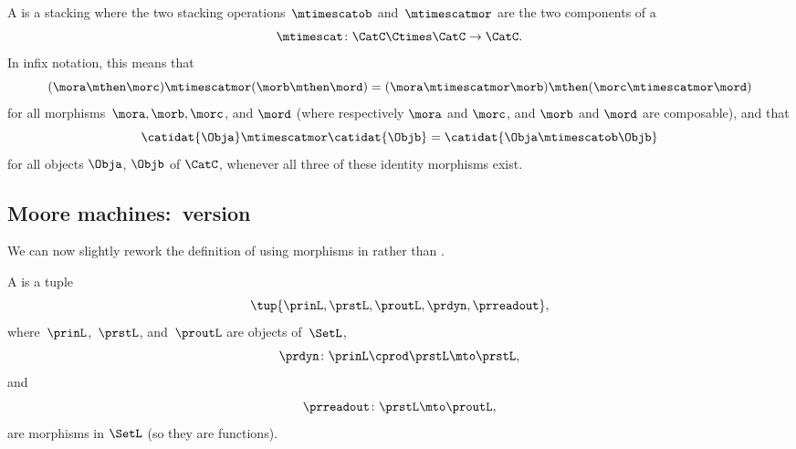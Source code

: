 \begin{ctdefinition}
    \label{def:functorial-stacking-semi-cat}
    A  is a stacking  where the two stacking operations~$\mtimescatob$ and~$\mtimescatmor$ are the two components of a  \begin{equation}
        \mtimescat\colon \CatC \Ctimes \CatC \to \CatC.
    \end{equation}
    In infix notation, this means that
    \begin{equation}
        (\mora \mthen \morc )
        \mtimescatmor (\morb \mthen \mord )
        =
        (\mora \mtimescatmor \morb )
        \mthen (\morc \mtimescatmor \mord )
    \end{equation}
    for all morphisms~$\mora, \morb, \morc$, and $\mord$ (where respectively $\mora$ and $\morc$, and $\morb$ and $\mord$ are composable), and that
    \begin{equation}
        \catidat{\Obja} \mtimescatmor \catidat{\Objb} = \catidat{\Obja \mtimescatob \Objb}
    \end{equation}
    for all objects $\Obja$, $\Objb$ of $\CatC$, whenever all three of these identity morphisms exist.
\end{ctdefinition}


\subsection{Moore machines:~\SetL version}
We can now slightly rework the definition of  using morphisms in \SetL rather than \Set.
\begin{definition}
    \label{def:moore-machine}
    A  is a tuple
    \begin{equation}
        \label{eq:moore-tuple-improved-again}
        \tup{\prinL,\prstL,\proutL,\prdyn,\prreadout},
    \end{equation}
    where~$\prinL$,~$\prstL$, and~$\proutL$ are objects of~$\SetL$,
    \begin{equation}
        \prdyn \colon \prinL \cprod \prstL \mto \prstL,
    \end{equation}
    and
    \begin{equation}
        \prreadout \colon \prstL \mto \proutL,
    \end{equation}
    are morphisms in $\SetL$ (so they are functions).
\end{definition}

